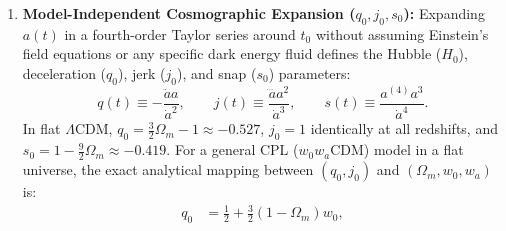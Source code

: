 \documentclass[aps,prd,preprint,superscriptaddress,nofootinbib]{revtex4-2}
\begin{document}
\begin{enumerate}
    \begin{itemize}
        \setlength{\itemsep}{2pt}
        \item \emph{Calibrated Thawing} ($1\text{ dof}$): $w_a = -1.58(1 + w_0)$, approximating slow-roll scalar fields thawing from $w = -1$ at early times.
        \item \emph{Algebraic Thawing} ($2\text{ dof}$, strictly enforcing $w(a) \ge -1$ at all redshifts):
        \begin{equation}
            1 + w(a) = (1 + w_0)\, a^p \left( \frac{1 + b}{1 + b a^{-3}} \right)^{1 - p/3}, \qquad b = 0.5, \quad w_0 \in [-1, 1], \quad p \in [0, 30].
            \label{m:eq:alg_thawing}
        \end{equation}
        \item \emph{Generalized Emergent Dark Energy ($1\text{ dof}$):} $f_{\rm DE}(z) = [1 - \tanh(\Delta \log_{10}((1+z)/(1+z_t)))] /$
        $[1 + \tanh(\Delta \log_{10}(1+z_t))]$, where dark energy emerges rapidly at late times with $\Delta=0$ recovering $\Lambda$CDM.
        \item \emph{Mirage Dark Energy} ($1\text{ dof}$): $w_a = -3.66(1 + w_0)$, which fixes the comoving distance to last scattering $D_M(z_*)$ to match a $\Lambda$CDM universe across variations of $w_0$, aligning with the principal eigenvector of the DESI+CMB+SNe contour in the $(w_0, w_a)$ plane.
    \end{itemize}
    \item \textbf{Model-Independent Cosmographic Expansion ($q_0, j_0, s_0$):} Expanding $a(t)$ in a fourth-order Taylor series around $t_0$ without assuming Einstein's field equations or any specific dark energy fluid defines the Hubble ($H_0$), deceleration ($q_0$), jerk ($j_0$), and snap ($s_0$) parameters:
    \begin{equation}
        q(t) \equiv -\frac{\ddot{a}a}{\dot{a}^2}, \qquad j(t) \equiv \frac{\dddot{a}a^2}{\dot{a}^3}, \qquad s(t) \equiv \frac{a^{(4)}a^3}{\dot{a}^4}.
        \label{m:eq:cosmography_defs}
    \end{equation}
    In flat $\Lambda$CDM, $q_0 = \frac{3}{2}\Omega_m - 1 \approx -0.527$, $j_0 = 1$ identically at all redshifts, and $s_0 = 1 - \frac{9}{2}\Omega_m \approx -0.419$. For a general CPL ($w_0 w_a$CDM) model in a flat universe, the exact analytical mapping between $(q_0, j_0)$ and $(\Omega_m, w_0, w_a)$ is:
    \begin{align}
        q_0 &= \frac{1}{2} + \frac{3}{2}(1 - \Omega_m) w_0, \label{m:eq:q0_cpl} \\

\end{align}
\end{enumerate}
\end{document}
